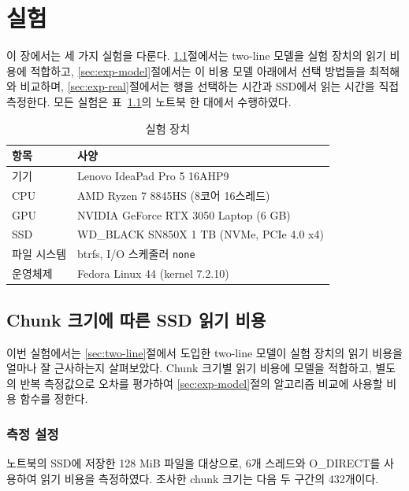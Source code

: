 \chapter{실험}\label{chap:experiments}

이 장에서는 세 가지 실험을 다룬다. \ref{sec:exp-latency}절에서는 two-line 모델을 실험 장치의 읽기 비용에 적합하고, \ref{sec:exp-model}절에서는 이 비용 모델 아래에서 선택 방법들을 최적해와 비교하며, \ref{sec:exp-real}절에서는 행을 선택하는 시간과 SSD에서 읽는 시간을 직접 측정한다. 모든 실험은 표~\ref{tab:environment}의 노트북 한 대에서 수행하였다.

\begin{table}[htbp]
    \centering
    \caption{실험 장치}
    \label{tab:environment}
    \begin{tabular}{ll}
        \toprule
        항목 & 사양 \\
        \midrule
        기기 & Lenovo IdeaPad Pro 5 16AHP9 \\
        CPU & AMD Ryzen 7 8845HS (8코어 16스레드) \\
        GPU & NVIDIA GeForce RTX 3050 Laptop (6 GB) \\
        SSD & WD\_BLACK SN850X 1 TB (NVMe, PCIe 4.0 x4) \\
        파일 시스템 & btrfs, I/O 스케줄러 \texttt{none} \\
        운영체제 & Fedora Linux 44 (kernel 7.2.10) \\
        \bottomrule
    \end{tabular}
\end{table}

\section{Chunk 크기에 따른 SSD 읽기 비용}\label{sec:exp-latency}

이번 실험에서는 \ref{sec:two-line}절에서 도입한 two-line 모델이 실험 장치의 읽기 비용을 얼마나 잘 근사하는지 살펴보았다. Chunk 크기별 읽기 비용에 모델을 적합하고, 별도의 반복 측정값으로 오차를 평가하여 \ref{sec:exp-model}절의 알고리즘 비교에 사용할 비용 함수를 정한다.

\subsection{측정 설정}\label{sec:exp-latency-setup}

노트북의 SSD에 저장한 128 MiB 파일을 대상으로, 6개 스레드와 O\_DIRECT를 사용하여 읽기 비용을 측정하였다. 조사한 chunk 크기는 다음 두 구간의 432개이다.

